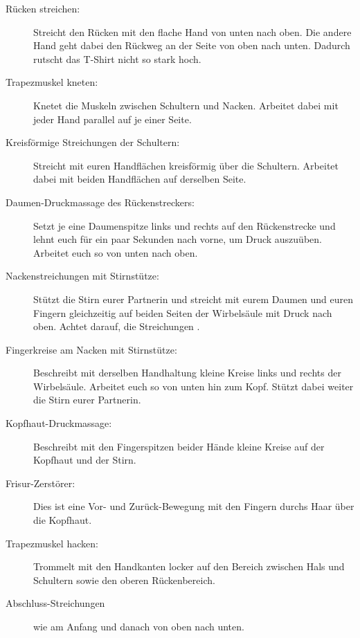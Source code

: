\begin{description}
  \item [Rücken streichen:] Streicht den Rücken mit den flache Hand von unten nach oben. Die andere Hand geht dabei den Rückweg an der Seite von oben nach unten. Dadurch rutscht das T-Shirt nicht so stark hoch.
  \item [Trapezmuskel kneten:] Knetet die Muskeln zwischen Schultern und Nacken. Arbeitet dabei mit jeder Hand parallel auf je einer Seite.
  \item [Kreisförmige Streichungen der Schultern:] Streicht mit euren Handflächen kreisförmig über die Schultern. Arbeitet dabei mit beiden Handflächen auf derselben Seite.
  \item [Daumen-Druckmassage des Rückenstreckers:] Setzt je eine Daumenspitze links und rechts auf den Rückenstrecke und lehnt euch für ein paar Sekunden nach vorne, um Druck auszuüben. Arbeitet euch so von unten nach oben.
  \item [Nackenstreichungen mit Stirnstütze:] Stützt die Stirn eurer Partnerin und streicht mit eurem Daumen und euren Fingern gleichzeitig auf beiden Seiten der Wirbelsäule mit Druck nach oben. Achtet darauf, die Streichungen .
  \item [Fingerkreise am Nacken mit Stirnstütze:] Beschreibt mit derselben Handhaltung kleine Kreise links und rechts der Wirbelsäule. Arbeitet euch so von unten hin zum Kopf. Stützt dabei weiter die Stirn eurer Partnerin.
  \item [Kopfhaut-Druckmassage:] Beschreibt mit den Fingerspitzen beider Hände kleine Kreise auf der Kopfhaut und der Stirn.
  \item [Frisur-Zerstörer:] Dies ist eine Vor- und Zurück-Bewegung mit den Fingern durchs Haar über die Kopfhaut.
  \item [Trapezmuskel hacken:] Trommelt mit den Handkanten locker auf den Bereich zwischen Hals und Schultern sowie den oberen Rückenbereich.
  \item [Abschluss-Streichungen] wie am Anfang und danach von oben nach unten.
\end{description}

